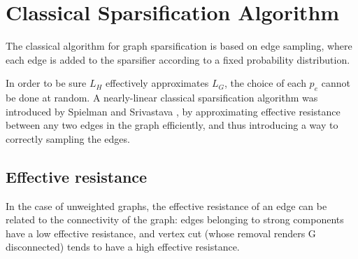 \section{Classical Sparsification Algorithm}
\label{seq:classical_sparsification}

The classical algorithm for graph sparsification is based on edge sampling,
where each edge is added to the sparsifier according to a fixed probability
distribution.

In order to be sure $L_H$ effectively approximates $L_G$, the choice of each
$p_e$ cannot be done at random. A nearly-linear classical sparsification
algorithm was introduced by Spielman and Srivastava
\cite{spielman_graph_2011}, by approximating effective resistance
between any two edges in the graph efficiently, and thus introducing a way to
correctly sampling the edges.

\subsection{Effective resistance}


In the case of unweighted graphs, the effective resistance of an edge can be
related to the connectivity of the graph: edges belonging to strong components
have a low effective resistance, and vertex cut (whose removal renders G
disconnected) tends to have a high effective resistance.

\begin{Figure}
    \centering
\end{Figure}

